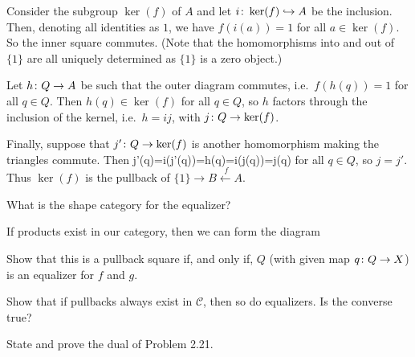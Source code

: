 \bs
Consider the subgroup $\ker (f)$ of $A$ and let $i\colon \ker (f)\hookrightarrow A$ be the inclusion. Then, denoting all identities as $1$, we have $f(i(a))=1$ for all $a\in \ker(f)$. So the inner square commutes. (Note that the homomorphisms into and out of $\{1\}$ are all uniquely determined as $\{1\}$ is a zero object.)
\bse
{}
\ese
Let $h\colon Q\to A$ be such that the outer diagram commutes, i.e.\ $f(h(q))=1$ for all $q\in Q$. Then $h(q)\in\ker(f)$ for all $q\in Q$, so $h$ factors through the inclusion of the kernel, i.e.\ $h=ij$, with $j\colon Q\to \ker (f)$. 

Finally, suppose that $j'\colon Q\to \ker(f)$ is another homomorphism making the triangles commute. Then
\bse
j'(q)=i(j'(q))=h(q)=i(j(q))=j(q)
\ese
for all $q\in Q$, so $j=j'$. Thus $\ker(f)$ is the pullback of $\{1\}\to B \xleftarrow{\ f}A$.
\es

\bx
\ben[label=(\alph*)]
\item What is the shape category for the equalizer?
\item If products exist in our category, then we can form the diagram
\bse
{}
\ese
Show that this is a pullback square if, and only if, $Q$ (with given map $q \colon Q \to X$) is an equalizer for $f$ and $g$.
\item Show that if pullbacks always exist in $\mathcal{C}$, then so do equalizers. Is the converse true?
\een
\ex

\bs
\ben[label=(\alph*)]
\item 
\item 
\item 
\een
\es

\bp
State and prove the dual of Problem 2.21.
\ep

